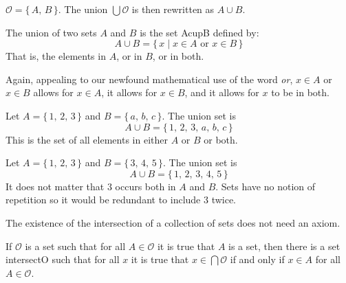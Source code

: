             $\mathcal{O}=\{\,A,\,B\,\}$. The union $\bigcup\mathcal{O}$ is then
            rewritten as $A\cup{B}$.
            \begin{definition}
                The union of two sets $A$ and $B$ is the set
                \gls{AcupB} defined by:
                \begin{equation}
                    A\cup{B}=\{\,x\;|\;x\in{A}\textrm{ or }x\in{B}\,\}
                \end{equation}
                That is, the elements in $A$, or in $B$, or in both.
            \end{definition}
            Again, appealing to our newfound mathematical use of the word
            \textit{or}, $x\in{A}$ or $x\in{B}$ allows for $x\in{A}$, it allows
            for $x\in{B}$, and it allows for $x$ to be in both.
            \begin{example}
                Let $A=\{\,1,\,2,\,3\,\}$ and $B=\{\,a,\,b,\,c\,\}$. The
                union set is
                \begin{equation}
                    A\cup{B}=\{\,1,\,2,\,3,\,a,\,b,\,c\,\}
                \end{equation}
                This is the set of all elements in either $A$ or $B$ or both.
            \end{example}
            \begin{example}
                Let $A=\{\,1,\,2,\,3\,\}$ and $B=\{\,3,\,4,\,5\,\}$. The union
                set is
                \begin{equation}
                    A\cup{B}=\{\,1,\,2,\,3,\,4,\,5\,\}
                \end{equation}
                It does not matter that $3$ occurs both in $A$ and $B$. Sets
                have no notion of repetition so it would be redundant to
                include $3$ twice.
            \end{example}
            The existence of the intersection of a collection of sets does
            not need an axiom.
            \begin{theorem}
                If $\mathcal{O}$ is a set such that for all $A\in\mathcal{O}$
                it is true that $A$ is a set, then there is a set
                \gls{intersectO} such that for all $x$ it is true that
                $x\in\bigcap\mathcal{O}$ if and only if $x\in{A}$ for all
                $A\in\mathcal{O}$.
            \end{theorem}
